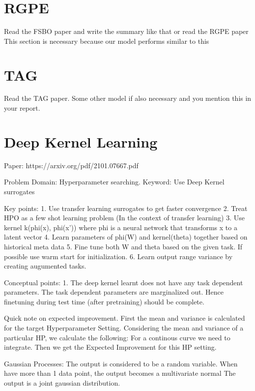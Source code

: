 \documentclass[11pt]{report}
\begin{document}
\section{RGPE}
Read the FSBO paper and write the summary like that or read  the RGPE paper
This section is necessary because our model performs similar to this

\section{TAG}
Read the TAG paper.
Some other model if also necessary and you mention this in your report.

\section{Deep Kernel Learning}

\iffalse
Paper: https://arxiv.org/pdf/2101.07667.pdf

Problem Domain: Hyperparameter searching.
Keyword: Use Deep Kernel surrogates

Key points:
    1. Use transfer learning surrogates to get faster convergence
    2. Treat HPO as a few shot learning problem (In the context of transfer learning)
    3. Use kernel k(phi(x), phi(x')) where phi is a neural network that transforms x to a latent vector
    4. Learn parameters of phi(W) and kernel(theta) together based on historical meta data
    5. Fine tune both W and theta based on the given task. If possible use warm start for initialization.
    6. Learn output range variance by creating augumented tasks.

Conceptual points:
    1. The deep kernel learnt does not have any task dependent parameters.
       The task dependent parameters are marginalized out.
       Hence finetuning during test time (after pretraining) should be complete.

Quick note on expected improvement.
    First the mean and variance is calculated for the target Hyperparameter Setting.
    Considering the mean and variance of a particular HP, we calculate the following:
        For a continous curve we need to integrate.
    Then we get the Expected Improvement for this HP setting.


Gaussian Processes:
    The output is considered to be a random variable.
    When have more than 1 data point, the output becomes a multivariate normal
        The output is a joint gaussian distribution.
\end{document}
